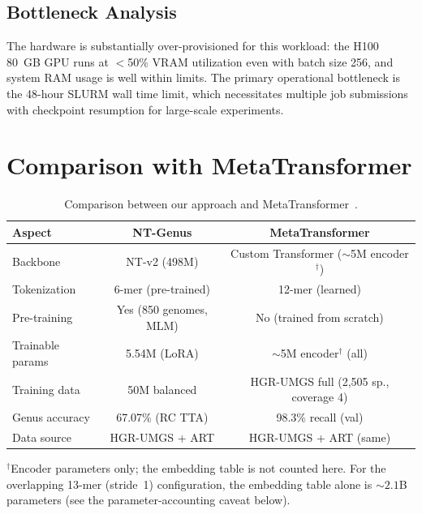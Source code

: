 \subsection{Bottleneck Analysis}

The hardware is substantially over-provisioned for this workload: the H100 80~GB GPU runs at $<$50\% VRAM utilization even with batch size 256, and system RAM usage is well within limits. The primary operational bottleneck is the 48-hour SLURM wall time limit, which necessitates multiple job submissions with checkpoint resumption for large-scale experiments.

\section{Comparison with MetaTransformer}
\label{sec:exp-comparison}

\begin{table}[htbp]
    \centering
    \caption{Comparison between our approach and MetaTransformer~\cite{Wichmann2023}.}
    \label{tab:metatransformer-comparison}
    \begin{tabular}{lcc}
        \toprule
        \textbf{Aspect} & \textbf{NT-Genus} & \textbf{MetaTransformer} \\
        \midrule
        Backbone & NT-v2 (498M) & Custom Transformer ($\sim$5M encoder$^\dagger$) \\
        Tokenization & 6-mer (pre-trained) & 12-mer (learned) \\
        Pre-training & Yes (850 genomes, MLM) & No (trained from scratch) \\
        Trainable params & 5.54M (LoRA) & $\sim$5M encoder$^\dagger$ (all) \\
        Training data & 50M balanced & HGR-UMGS full (2,505 sp., coverage 4) \\
        Genus accuracy & 67.07\% (RC TTA) & 98.3\% recall (val) \\
        Data source & HGR-UMGS + ART & HGR-UMGS + ART (same) \\
        \bottomrule
    \end{tabular}
    \begin{minipage}{\linewidth}
        \vspace{2pt}
        \footnotesize $^\dagger$Encoder parameters only; the embedding table is not counted here. For the overlapping 13-mer (stride~1) configuration, the embedding table alone is ${\sim}2.1$B parameters (see the parameter-accounting caveat below).
    \end{minipage}
\end{table}

